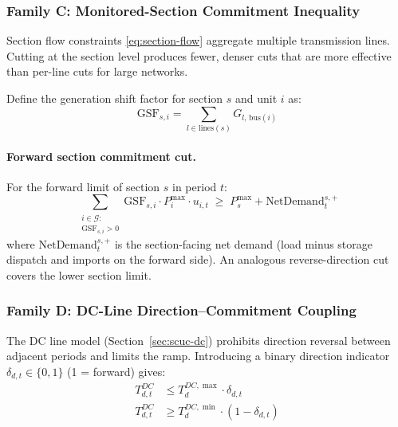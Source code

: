 \subsubsection{Family C: Monitored-Section Commitment Inequality}
\label{sec:cut-C}

Section flow constraints \eqref{eq:section-flow} aggregate multiple
transmission lines.  Cutting at the section level produces fewer, denser
cuts that are more effective than per-line cuts for large networks.

Define the generation shift factor for section $s$ and unit $i$ as:
\begin{equation}
  \mathrm{GSF}_{s,i} = \sum_{l \in \mathrm{lines}(s)} G_{l,\,\mathrm{bus}(i)}
\end{equation}

\paragraph{Forward section commitment cut.}
For the forward limit of section $s$ in period $t$:
\begin{equation}\label{eq:cut-C-fwd}
  \boxed{
    \sum_{\substack{i \in \mathcal{G}: \\ \mathrm{GSF}_{s,i} > 0}}
      \mathrm{GSF}_{s,i} \cdot P^{\max}_i \cdot u_{i,t}
    \;\geq\;
    P^{\max}_s + \mathrm{NetDemand}^{s,+}_t
  }
\end{equation}
where $\mathrm{NetDemand}^{s,+}_t$ is the section-facing net demand
(load minus storage dispatch and imports on the forward side).
An analogous reverse-direction cut covers the lower section limit.

\subsubsection{Family D: DC-Line Direction--Commitment Coupling}
\label{sec:cut-D}

The DC line model (Section~\ref{sec:scuc-dc}) prohibits direction reversal
between adjacent periods and limits the ramp.  Introducing a binary
direction indicator $\delta_{d,t} \in \{0,1\}$ (1 = forward) gives:
\begin{align}
  T^{DC}_{d,t} &\leq T^{DC,\max}_d \cdot \delta_{d,t} \label{eq:dc-dir-ub}\\
  T^{DC}_{d,t} &\geq T^{DC,\min}_d \cdot (1-\delta_{d,t}) \label{eq:dc-dir-lb}
\end{align}

